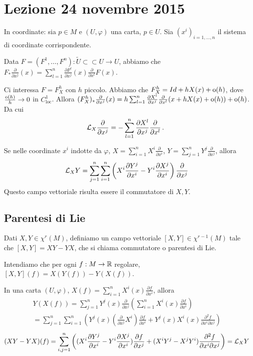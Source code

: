 \chapter{Lezione 24 novembre 2015}

In coordinate: sia $p\in M$ e $(U,\varphi)$ una carta, $p\in U$. Sia $(x^i)_{i=1,\ldots,n}$ il sistema di coordinate corrispondente.

Data $F=(F^1,\ldots,F^n):\tilde U \subset\subset U \to U$, abbiamo che $F_*\frac\partial{\partial x^j}(x)=\sum_{l=1}^n \frac{\partial F^l}{\partial x^j}(x)\frac\partial{\partial x^l}F(x)$.

Ci interessa $F=F_X^h$ con $h$ piccolo. Abbiamo che $F_X^h=Id+hX(x)+\mathrm{o}(h)$, dove $\frac{\mathrm{o}(h)}{h}\to 0$ in $C^1_{\text{loc}}$.
Allora $(F_X^h)_*\frac\partial{\partial x^j}(x)=h\sum_{l=1}^n \frac{\partial X^l}{\partial x^j}\frac\partial{\partial x^l}(x+hX(x)+\mathrm{o}(h))+\mathrm{o}(h)$.
Da cui
\begin{equation*}
	\mathcal L_X\frac\partial{\partial x^j}=-\sum_{l=1}^n \frac{\partial X^l}{\partial x^j}\frac\partial{\partial x^l}\, \text{. }
\end{equation*}

Se nelle coordinate $x^i$ indotte da $\varphi$, $X=\sum_{i=1}^n X^i\frac\partial{\partial x^i}$, $Y=\sum_{j=1}^n Y^j\frac\partial{\partial x^j}$, allora
\begin{equation*}
	\mathcal L_XY=\sum_{j=1}^n\sum_{i=1}^n \left(X^i\frac{\partial Y^j}{\partial x^i}-Y^i\frac{\partial X^j}{\partial x^i}\right)\frac\partial{\partial x^j}
\end{equation*}
Questo campo vettoriale risulta essere il commutatore di $X,Y$.

\section{Parentesi di Lie}
\begin{definition}
Dati $X,Y\in\chi^r(M)$, definiamo un campo vettoriale $[X,Y]\in\chi^{r-1}(M)$ tale che $[X,Y]=XY-YX$, che si chiama commutatore o parentesi di Lie.

Intendiamo che per ogni $f:M\to\mathbb R$ regolare, $[X,Y](f)=X(Y(f))-Y(X(f))$.
\end{definition}

In una carta $(U,\varphi)$, $X(f)=\sum_{i=1}^n X^i(x)\frac{\partial f}{\partial x^i}$, allora
\begin{multline*}
	Y(X(f))=\sum_{j=1}^nY^j(x)\frac\partial{\partial x^j}\left( \sum_{i=1}^n X^i(x)\frac{\partial f}{\partial x^i} \right)\\
	= \sum_{j=1}^n \sum_{i=1}^n \left( Y^j(x) (\frac{\partial}{\partial x^j}X^i)\frac{\partial f}{\partial x^i} +Y^j(x)X^i(x)\frac{\partial^2 f}{\partial x^i\partial x^j} \right)
\end{multline*}
\begin{equation*}
	(XY-YX)(f)=\sum_{i,j=1}^n\left((X^i\frac{\partial Y^j}{\partial x^i}-Y^i\frac{\partial X^j}{\partial x^i})\frac{\partial f}{\partial x^j} +(X^iY^j-X^jY^i)\frac{\partial^2 f}{\partial x^i\partial x^j}  \right)=\mathcal L_XY
\end{equation*}

